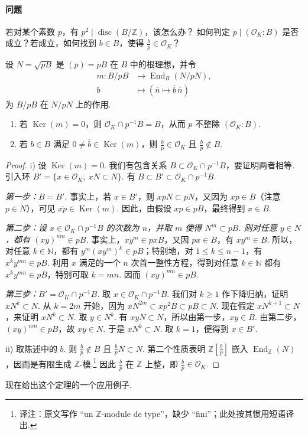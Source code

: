 \paragraph{问题}
若对某个素数 $p$，有 $p^2\mid\operatorname{disc}(B/\mathbb Z)$，该怎么办？
如何判定 $p\mid(\mathcal O_K:B)$ 是否成立？若成立，如何找到 $b\in B$，使得 $\frac bp\in\mathcal O_K$？
\begin{theorem*}
设 $N=\sqrt{pB}$ 是 $(p)=pB$ 在 $B$ 中的根理想，并令
\begin{align*}
m\colon B/pB&\longrightarrow\operatorname{End}_B(N/pN),\\
b&\longmapsto(\overline n\longmapsto\overline b\,\overline n)
\end{align*}
为 $B/pB$ 在 $N/pN$ 上的作用.
\begin{enumerate}[label=\roman*)]
\item 若 $\operatorname{Ker}(m)=0$，则 $\mathcal O_K\cap p^{-1}B=B$，从而 $p$ 不整除 $(\mathcal O_K:B)$.
\item 若 $b\in B$ 满足 $0\ne\overline b\in\operatorname{Ker}(m)$，则 $\frac bp\in\mathcal O_K$ 且 $\frac bp\notin B$.
\end{enumerate}
\end{theorem*}
\begin{proof}
i) 设 $\operatorname{Ker}(m)=0$. 我们有包含关系 $B\subset\mathcal O_K\cap p^{-1}B$，要证明两者相等.
引入环 $B'=\{x\in\mathcal O_K,\ xN\subset N\}$.
有 $B\subset B'\subset\mathcal O_K\cap p^{-1}B$.

\emph{第一步：$B=B'$.}
事实上，若 $x\in B'$，则 $xpN\subset pN$，又因为 $xp\in B$（注意 $p\in N$），可见 $\overline{xp}\in\operatorname{Ker}(m)$.
因此，由假设 $xp\in pB$，最终得到 $x\in B$.

\emph{第二步：设 $x\in\mathcal O_K\cap p^{-1}B$ 的次数为 $n$，并取 $m$ 使得 $N^m\subset pB$.
则对任意 $y\in N$，都有 $(xy)^{nm}\in pB$.}
事实上，$xy^m\in pxB$，又因 $px\in B$，有 $xy^m\in B$.
所以，对任意 $k\in\mathbb N$，都有 $y^m(xy^m)^k\in pB$；特别地，对 $1\leq k\leq n-1$，有 $x^ky^{mn}\in pB$.
利用 $x$ 满足的一个 $n$ 次首一整性方程，得到对任意 $k\in\mathbb N$ 都有 $x^ky^{mn}\in pB$，特别可取 $k=mn$.
因而 $(xy)^{mn}\in pB$.

\emph{第三步：$B'=\mathcal O_K\cap p^{-1}B$.}
取 $x\in\mathcal O_K\cap p^{-1}B$.
我们对 $k\geq1$ 作下降归纳，证明 $xN^k\subset N$.
从 $k=2m$ 开始，因为 $xN^{2m}\subset xp^2B\subset pB\subset N$.
现在假定 $xN^{k+1}\subset N$，来证明 $xN^k\subset N$.
取 $y\in N^k$. 有 $xyN\subset N$，所以由第一步，$xy\in B$.
由第二步，$(xy)^{nm}\in pB$，故 $xy\in N$.
于是 $xN^k\subset N$. 取 $k=1$，便得到 $x\in B'$.

ii) 取陈述中的 $b$. 则 $\frac bp\notin B$ 且 $\frac bpN\subset N$.
第二个性质表明 $\mathbb Z[\frac bp]$ 嵌入 $\operatorname{End}_{\mathbb Z}(N)$，因而是有限生成 $\mathbb Z$-模.\footnote{译注：原文写作 ``un $\mathbb Z$-module de type''，缺少 ``fini''；此处按其惯用短语译出.}
因此 $\frac bp$ 在 $\mathbb Z$ 上整，即 $\frac bp\in\mathcal O_K$.
\end{proof}
现在给出这个定理的一个应用例子.

